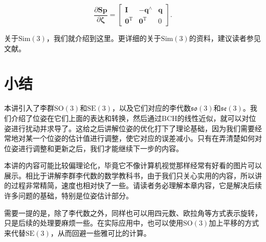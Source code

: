 \begin{equation}
\frac{{\partial \bm{Sp}}}{{\partial \boldsymbol{\zeta} }} = \left[ {\begin{array}{*{20}{c}}
	\bm{I} &{ - {\bm{q}^ \wedge }}& \bm{q} \\
	{{\bm{0}^\mathrm{T}}} & {{ \bm{0}^\mathrm{T}}}&0
	\end{array}} \right].
\end{equation}

关于$\mathrm{Sim}(3)$，我们就介绍到这里。更详细的关于$\mathrm{Sim}(3)$的资料，建议读者参见文献\cite{Strasdat2012a}。


\section{小结}
本讲引入了李群$\mathrm{SO}(3)$和$\mathrm{SE}(3)$，以及它们对应的李代数$\mathfrak{so}(3)$和$\mathfrak{se}(3)$。我们介绍了位姿在它们上面的表达和转换，然后通过BCH的线性近似，就可以对位姿进行扰动并求导了。这给之后讲解位姿的优化打下了理论基础，因为我们需要经常地对某一个位姿的估计值进行调整，使它对应的误差减小。只有在弄清楚如何对位姿进行调整和更新之后，我们才能继续下一步的内容。

本讲的内容可能比较偏理论化，毕竟它不像计算机视觉那样经常有好看的图片可以展示。相比于讲解李群李代数的数学教科书，由于我们只关心实用的内容，所以讲的过程非常精简，速度也相对快了一些。请读者务必理解本章内容，它是解决后续许多问题的基础，特别是位姿估计部分。

需要一提的是，除了李代数之外，同样也可以用四元数、欧拉角等方式表示旋转，只是后续的处理要麻烦一些。在实际应用中，也可以使用$\mathrm{SO}(3)$加上平移的方式来代替$\mathrm{SE}(3)$，从而回避一些雅可比的计算。

